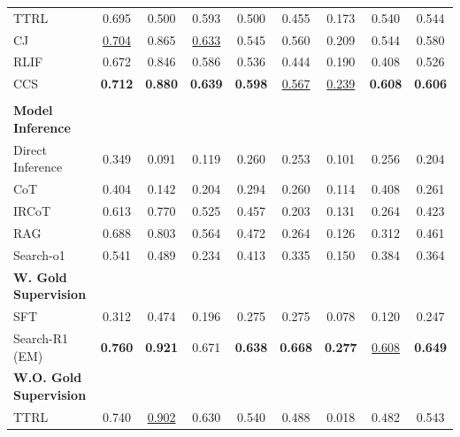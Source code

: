 \begin{table}[htbp]
{\begin{tabular}{lcccccccc}
\hspace{1em}TTRL & 0.695 & 0.500 & 0.593 & 0.500 & 0.455 & 0.173 & 0.540 & 0.544 \\
\hspace{1em}CJ & \underline{0.704} & 0.865 & \underline{0.633} & 0.545 & 0.560 & 0.209 & 0.544 & 0.580 \\
\hspace{1em}RLIF & 0.672 & 0.846 & 0.586 & 0.536 & 0.444 & 0.190 & 0.408 & 0.526 \\
\hspace{1em}CCS & \textbf{0.712} & \textbf{0.880} & \textbf{0.639} & \textbf{0.598} & \underline{0.567} & \underline{0.239} & \textbf{0.608} & \textbf{0.606} \\
\midrule
\rowcolor{gray!10}
\multicolumn{9}{c}{\textbf{\textit{Qwen3-4B-Instruct-2507}}} \\
\textbf{Model Inference} & & & & & & & & \\
\hspace{1em}Direct Inference & 0.349 & 0.091 & 0.119 & 0.260 & 0.253 & 0.101 & 0.256 & 0.204 \\
\hspace{1em}CoT & 0.404 & 0.142 & 0.204 & 0.294 & 0.260 & 0.114 & 0.408 & 0.261 \\
\hspace{1em}IRCoT & 0.613 & 0.770 & 0.525 & 0.457 & 0.203 & 0.131 & 0.264 & 0.423 \\
\hspace{1em}RAG & 0.688 & 0.803 & 0.564 & 0.472 & 0.264 & 0.126 & 0.312 & 0.461 \\
\hspace{1em}Search-o1 & 0.541 & 0.489 & 0.234 & 0.413 & 0.335 & 0.150 & 0.384 & 0.364 \\
\textbf{W. Gold Supervision} & & & & & & & & \\
\hspace{1em}SFT & 0.312 & 0.474 & 0.196 & 0.275 & 0.275 & 0.078 & 0.120 & 0.247 \\
\hspace{1em}Search-R1 (EM) & \textbf{0.760} & \textbf{0.921} & 0.671 & \textbf{0.638} & \textbf{0.668} & \textbf{0.277} & \underline{0.608} & \textbf{0.649} \\
\textbf{W.O. Gold Supervision} & & & & & & & & \\
\hspace{1em}TTRL & 0.740 & \underline{0.902} & 0.630 & 0.540 & 0.488 & 0.018 & 0.482 & 0.543 \\

\end{tabular}}
\end{table}
